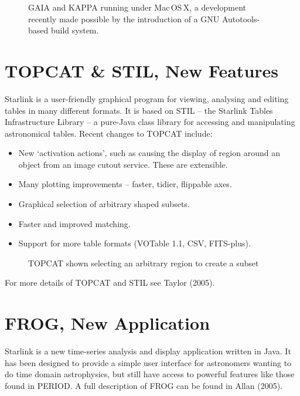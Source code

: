 \documentclass[11pt,twoside]{article}  %
\begin{document}
\begin{figure}
\caption{GAIA and KAPPA running under Mac\,OS\,X, a development recently made
possible by the introduction of a GNU Autotools-based build system.}
\end{figure}

\section{TOPCAT \& STIL, New Features}

Starlink  
is a user-friendly graphical program for viewing, analysing
and editing tables in many different formats. It is based on STIL --
the Starlink Tables Infrastructure Library -- a pure-Java class library for
accessing and manipulating astronomical tables. Recent changes to
TOPCAT include:
\begin{itemize}
\item New `activation actions', such as causing the display of region around
      an object from an image cutout service. These are extensible.
\item Many plotting improvements -- faster, tidier, flippable axes.
\item Graphical selection of arbitrary shaped subsets.
\item Faster and improved matching.
\item Support for more table formats (VOTable 1.1, CSV, FITS-plus).
\end{itemize}

\begin{figure}
\caption{TOPCAT shown selecting an arbitrary region to create a subset}
\end{figure}

For more details of TOPCAT and STIL see Taylor (2005).

\section{FROG, New Application}

Starlink  is a new
time-series analysis and display application written in Java. It has been
designed to provide a simple user interface for astronomers wanting to do time
domain astrophysics, but still have access to powerful features like those
found in PERIOD. A full description of FROG can be found in Allan (2005).
\end{document}
